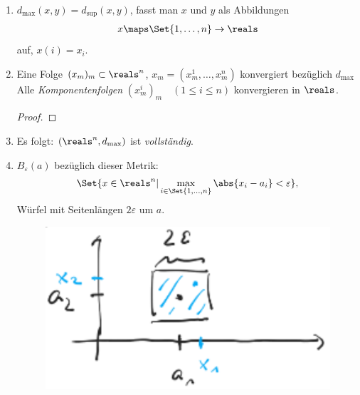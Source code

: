 \begin{bemerkungen*}
    \begin{enumerate}
        \item \( d_{\max}(x,y)=d_{\sup}(x,y)\), fasst man \( x\) und \( y\) als Abbildungen
        \begin{align*}
            x\maps \Set{1,\ldots, n}\to \reals 
        \end{align*} 
        auf, \( x(i)=x_i\).
        \item \label{d_max:folgenkonvergenz}Eine Folge \( (x_m)_m\subset \reals^n \), \( x_m=(x_m^1,\ldots, x_m^n)\) konvergiert bezüglich \( d_{\max}\) \tiff Alle \emph{Komponentenfolgen} \( (x_m^i)_m\quad (1\leq i\leq n)\) konvergieren in \( \reals \).
        \begin{proof}
            
            
        \end{proof}
        
        \item Es folgt: \( (\reals^n, d_{\max})\) ist \emph{vollständig}.
        \item \( B_\varepsilon(a)\) bezüglich dieser Metrik:
        \begin{align*}
            \Set{x\in \reals ^n |\max_{i\in \Set{1,\ldots, n}}\abs{x_i-a_i}<\varepsilon},
        \end{align*}
        Würfel mit Seitenlängen \( 2\varepsilon\) um \( a\).
        \begin{figure}[H]
            \centering
            \includegraphics[width=0.3\linewidth]{figures/d_max_ball}
            \label{fig:d_max_ball}
        \end{figure}
        
    \end{enumerate}
\end{bemerkungen*}

